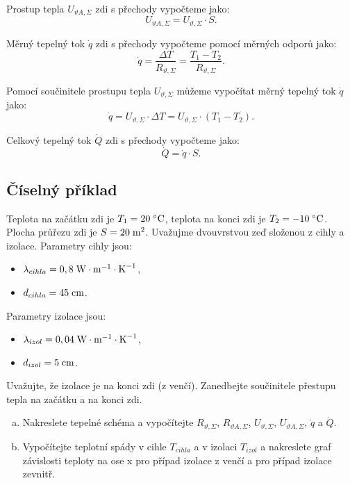 \documentclass{article}
\begin{document}
Prostup tepla $U_{\vartheta A,\Sigma}$ zdi s přechody vypočteme jako:
$$
    U_{\vartheta A,\Sigma} = U_{\vartheta,\Sigma} \cdot S.
$$

Měrný tepelný tok $\dot{q}$ zdi s přechody vypočteme pomocí měrných odporů jako:
$$
    \dot{q} = \frac{\Delta T}{R_{\vartheta,\Sigma}} = \frac{T_1 - T_2}{R_{\vartheta,\Sigma}}.
$$

Pomocí součinitele prostupu tepla $U_{\vartheta,\Sigma}$ můžeme vypočítat měrný tepelný tok $\dot{q}$ jako:
$$
    \dot{q} = U_{\vartheta,\Sigma} \cdot \Delta T = U_{\vartheta,\Sigma} \cdot (T_1 - T_2).
$$

Celkový tepelný tok $\dot{Q}$ zdi s přechody vypočteme jako:
$$
    \dot{Q} = \dot{q} \cdot S.
$$



\subsection{Číselný příklad}
Teplota na začátku zdi je $T_1 = 20 \; ^\circ \textrm{C}$, teplota na konci zdi je $T_2 = -10 \; ^\circ \textrm{C}$. Plocha průřezu zdi je $S = 20 \; \textrm{m}^{\textrm{2}}$. Uvažujme dvouvrstvou zeď složenou z cihly a izolace. Parametry cihly jsou:
\begin{itemize}
    \item $\lambda_{cihla} = 0,8 \; \textrm{W} \cdot \textrm{m}^{-1} \cdot \textrm{K}^{-1}$,
    \item $d_{cihla} = 45 \; \textrm{cm}$.
\end{itemize}

Parametry izolace jsou:
\begin{itemize}
    \item $\lambda_{izol} = 0,04 \; \textrm{W} \cdot \textrm{m}^{-1} \cdot \textrm{K}^{-1}$,
    \item $d_{izol} = 5 \; \textrm{cm}$.
\end{itemize}

Uvažujte, že izolace je na konci zdi (z venčí). Zanedbejte součinitele přestupu tepla na začátku a na konci zdi.
\begin{enumerate}[a)]
    \item Nakreslete tepelné schéma a vypočítejte $R_{\vartheta,\Sigma}$, $R_{\vartheta A,\Sigma}$, $U_{\vartheta,\Sigma}$, $U_{\vartheta A,\Sigma}$, $\dot{q}$ a $\dot{Q}$.
    \item Vypočítejte teplotní spády v cihle $T_{cihla}$ a v izolaci $T_{izol}$ a nakreslete graf závislosti teploty na ose x pro případ izolace z venčí a pro případ izolace zevnitř.
\end{enumerate}
\end{document}
